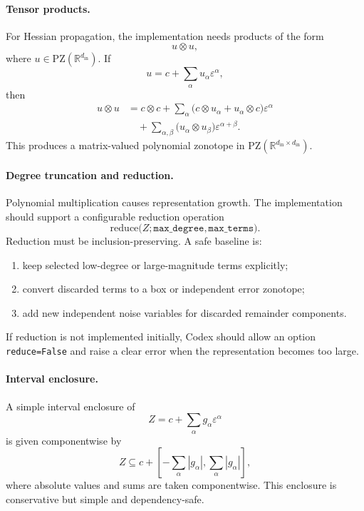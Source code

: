 \documentclass[11pt]{article}
\newcommand{\R}{\mathbb{R}}
\newcommand{\PZ}{\mathrm{PZ}}
\newcommand{\eps}{\varepsilon}
\begin{document}
\paragraph{Tensor products.}
For Hessian propagation, the implementation needs products of the form
\[
    u\otimes u,
\]
where \(u\in\PZ(\R^{d_{\mathrm{in}}})\). If
\[
    u=c+\sum_\alpha u_\alpha\eps^\alpha,
\]
then
\[
\begin{aligned}
    u\otimes u
    &=
    c\otimes c
    +
    \sum_\alpha
    \bigl(c\otimes u_\alpha+u_\alpha\otimes c\bigr)\eps^\alpha \\
    &\quad+
    \sum_{\alpha,\beta}
    \bigl(u_\alpha\otimes u_\beta\bigr)\eps^{\alpha+\beta}.
\end{aligned}
\]
This produces a matrix-valued polynomial zonotope in \(\PZ(\R^{d_{\mathrm{in}}\times d_{\mathrm{in}}})\).

\paragraph{Degree truncation and reduction.}
Polynomial multiplication causes representation growth. The implementation should support a configurable reduction operation
\[
    \mathrm{reduce}\bigl(Z;\texttt{max\_degree},\texttt{max\_terms}\bigr).
\]
Reduction must be inclusion-preserving. A safe baseline is:
\begin{enumerate}[label=(\alph*)]
    \item keep selected low-degree or large-magnitude terms explicitly;
    \item convert discarded terms to a box or independent error zonotope;
    \item add new independent noise variables for discarded remainder components.
\end{enumerate}
If reduction is not implemented initially, Codex should allow an option \texttt{reduce=False} and raise a clear error when the representation becomes too large.

\paragraph{Interval enclosure.}
A simple interval enclosure of
\[
    Z=c+\sum_\alpha g_\alpha\eps^\alpha
\]
is given componentwise by
\[
    Z
    \subseteq
    c+
    \left[
        -\sum_\alpha |g_\alpha|,
        \sum_\alpha |g_\alpha|
    \right],
\]
where absolute values and sums are taken componentwise. This enclosure is conservative but simple and dependency-safe.
\end{document}
